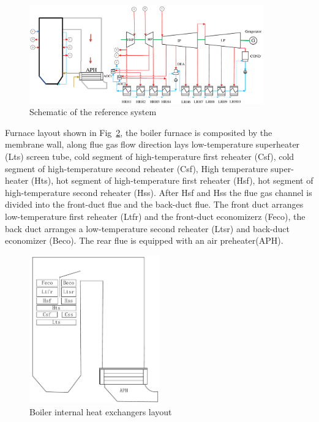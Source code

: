 \documentclass[preprint,12pt]{elsarticle}
\begin{document}
\begin{figure}[htbp]
\centering
\includegraphics[width=0.9\textwidth]{fig/reference_system}
\caption{Schematic of the reference system} 
\label{fig:reference_system}
\end{figure}
Furnace layout shown in Fig~\ref{fig:boiler_surface}, the boiler furnace is composited by the membrane wall, along flue gas flow direction lays low-temperature superheater (Lts) screen tube, cold segment of high-temperature ﬁrst reheater (Csf), cold segment of high-temperature second reheater (Csf), High temperature super-heater (Hts), hot segment of high-temperature ﬁrst reheater (Hsf), hot segment of high-temperature second reheater (Hss).
After Hsf and Hss the flue gas channel is divided into the front-duct flue and the back-duct flue. The front duct arranges low-temperature first reheater (Ltfr) and the front-duct economizerz (Feco), the back duct arranges a low-temperature second reheater (Ltsr) and back-duct economizer (Beco). The rear flue is equipped with an air preheater(APH).
\begin{figure}[htbp]
\centering
\includegraphics[width=0.5\textwidth]{fig/boiler_surface}
\caption{Boiler internal heat exchangers layout} 
\label{fig:boiler_surface}
\end{figure}
\end{document}
